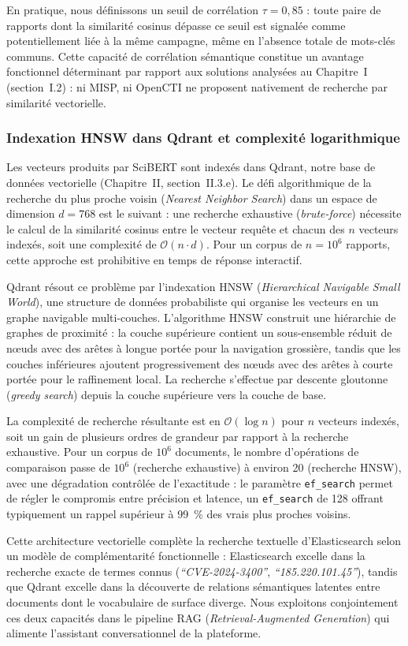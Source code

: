 En pratique, nous définissons un seuil de corrélation $\tau = 0{,}85$ : toute paire de rapports dont la similarité cosinus dépasse ce seuil est signalée comme potentiellement liée à la même campagne, même en l'absence totale de mots-clés communs. Cette capacité de corrélation sémantique constitue un avantage fonctionnel déterminant par rapport aux solutions analysées au Chapitre~I (section~I.2) : ni MISP, ni OpenCTI ne proposent nativement de recherche par similarité vectorielle.

\subsubsection{Indexation HNSW dans Qdrant et complexité logarithmique}

Les vecteurs produits par SciBERT sont indexés dans Qdrant, notre base de données vectorielle (Chapitre~II, section~II.3.e). Le défi algorithmique de la recherche du plus proche voisin (\textit{Nearest Neighbor Search}) dans un espace de dimension $d = 768$ est le suivant : une recherche exhaustive (\textit{brute-force}) nécessite le calcul de la similarité cosinus entre le vecteur requête et chacun des $n$ vecteurs indexés, soit une complexité de $\mathcal{O}(n \cdot d)$. Pour un corpus de $n = 10^6$ rapports, cette approche est prohibitive en temps de réponse interactif.

Qdrant résout ce problème par l'indexation HNSW (\textit{Hierarchical Navigable Small World}), une structure de données probabiliste qui organise les vecteurs en un graphe navigable multi-couches. L'algorithme HNSW construit une hiérarchie de graphes de proximité : la couche supérieure contient un sous-ensemble réduit de n\oe uds avec des arêtes à longue portée pour la navigation grossière, tandis que les couches inférieures ajoutent progressivement des n\oe uds avec des arêtes à courte portée pour le raffinement local. La recherche s'effectue par descente gloutonne (\textit{greedy search}) depuis la couche supérieure vers la couche de base.

La complexité de recherche résultante est en $\mathcal{O}(\log n)$ pour $n$ vecteurs indexés, soit un gain de plusieurs ordres de grandeur par rapport à la recherche exhaustive. Pour un corpus de $10^6$ documents, le nombre d'opérations de comparaison passe de $10^6$ (recherche exhaustive) à environ 20 (recherche HNSW), avec une dégradation contrôlée de l'exactitude : le paramètre \texttt{ef\_search} permet de régler le compromis entre précision et latence, un \texttt{ef\_search} de 128 offrant typiquement un rappel supérieur à 99~\% des vrais plus proches voisins.

Cette architecture vectorielle complète la recherche textuelle d'Elasticsearch selon un modèle de complémentarité fonctionnelle : Elasticsearch excelle dans la recherche exacte de termes connus (\textit{``CVE-2024-3400''}, \textit{``185.220.101.45''}), tandis que Qdrant excelle dans la découverte de relations sémantiques latentes entre documents dont le vocabulaire de surface diverge. Nous exploitons conjointement ces deux capacités dans le pipeline RAG (\textit{Retrieval-Augmented Generation}) qui alimente l'assistant conversationnel de la plateforme.

